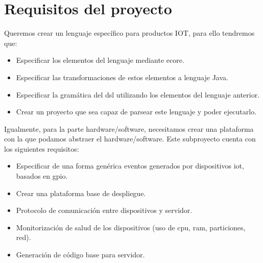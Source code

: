 \section{Requisitos del proyecto}

Queremos crear un lenguaje específico para productos IOT, para ello tendremos que:

\begin{itemize}
\item Especificar los elementos del lenguaje mediante \gls{ecore}.
\item Especificar las transformaciones de estos elementos a lenguaje Java.
\item Especificar la gramática del \gls{dsl} utilizando los elementos del lenguaje anterior.
\item Crear un proyecto que sea capaz de parsear este lenguaje y poder ejecutarlo.
\end{itemize}


Igualmente, para la parte hardware/software, necesitamos crear una plataforma con la que podamos abstraer el hardware/software. Este subproyecto cuenta con los siguientes requisitos:

\begin{itemize}

\item Especificar de una forma genérica eventos generados por dispositivos \gls{iot}, basados en \gls{gpio}.
\item Crear una plataforma base de despliegue.
\item Protocolo de comunicación entre dispositivos y servidor.
\item Monitorización de salud de los dispositivos (uso de cpu, ram, particiones, red).
\item Generación de código base para servidor.

\end{itemize}

